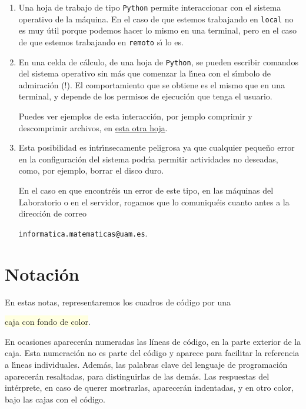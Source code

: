 \begin{enumerate}
\item Una hoja de trabajo de tipo {\tt Python} permite interaccionar con el sistema operativo de la m\'aquina. En el caso de que estemos trabajando en {\tt local} no es muy \'util porque podemos hacer lo mismo en una terminal, pero en el caso de que estemos trabajando en {\tt remoto} s\'{\i} lo es. 

\item En una celda de c\'alculo, de una hoja de {\tt Python}, se pueden escribir comandos del sistema operativo sin m\'as que comenzar la l\'{\i}nea con el s\'{\i}mbolo de admiraci\'on (!). El comportamiento que se obtiene es el mismo que en una terminal, y depende de los permisos de ejecuci\'on que tenga el usuario.

Puedes ver  ejemplos de esta interacci\'on, por jemplo comprimir y descomprimir archivos,  en 
\href{http://localhost:8888/notebooks/INTRO/Interaccion-con-SO.ipynb}{esta otra hoja}.

\item Esta posibilidad es intr\'{\i}nsecamente peligrosa ya que cualquier peque\~no error en la configuraci\'on del sistema podr\'{\i}a permitir actividades no deseadas, como, por ejemplo, borrar el disco duro.

En el caso en que encontr\'eis un error de este tipo, en las m\'aquinas del Laboratorio o en el servidor,  rogamos que lo comuniqu\'eis cuanto antes a la direcci\'on de correo
\begin{center}
\verb=informatica.matematicas@uam.es=. 
\end{center}
\end{enumerate}



\section{Notación}

En estas notas, representaremos los cuadros de código por una
\begin{center}
\colorbox{LightYellow}{caja con fondo de color}.
\end{center}
 En ocasiones aparecerán
numeradas las líneas de código,  en la parte exterior de la caja. Esta
numeración no es parte del código y aparece para facilitar la referencia a l\'{\i}neas individuales.
Además, las palabras clave del lenguaje de programación aparecerán resaltadas, 
para distinguirlas de las demás. Las respuestas del intérprete, 
en caso de querer mostrarlas, aparecerán indentadas, y en otro color, bajo las
cajas 
con el código.

